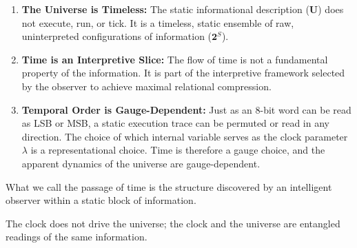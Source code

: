 \begin{enumerate}
    \item \textbf{The Universe is Timeless:} The static informational description ($\mathbf{U}$) does not execute, run, or tick. 
    It is a timeless, static ensemble of raw, uninterpreted configurations of information ($\mathbf{2}^S$). 
    \item \textbf{Time is an Interpretive Slice:} The flow of time is not a fundamental property of the information. 
    It is part of the interpretive framework selected by the observer to achieve maximal relational compression.
    \item \textbf{Temporal Order is Gauge-Dependent:} Just as an 8-bit word can be read as LSB or MSB, a static execution trace can be permuted or read in any direction. 
    The choice of which internal variable serves as the clock parameter $\lambda$ is a representational choice. 
    Time is therefore a gauge choice, and the apparent dynamics of the universe are gauge-dependent.
\end{enumerate}

What we call the passage of time is the structure discovered by an intelligent observer within a static block of information.

The clock does not drive the universe; the clock and the universe are entangled readings of the same information.


